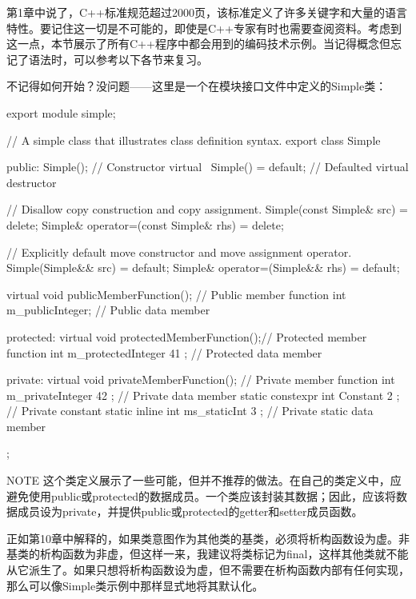 
第1章中说了，C++标准规范超过2000页，该标准定义了许多关键字和大量的语言特性。要记住这一切是不可能的，即使是C++专家有时也需要查阅资料。考虑到这一点，本节展示了所有C++程序中都会用到的编码技术示例。当记得概念但忘记了语法时，可以参考以下各节来复习。


不记得如何开始？没问题——这里是一个在模块接口文件中定义的Simple类：

\begin{cpp}
export module simple;

// A simple class that illustrates class definition syntax.
export class Simple
{
    public:
        Simple(); // Constructor
        virtual ~Simple() = default; // Defaulted virtual destructor

        // Disallow copy construction and copy assignment.
        Simple(const Simple& src) = delete;
        Simple& operator=(const Simple& rhs) = delete;

        // Explicitly default move constructor and move assignment operator.
        Simple(Simple&& src) = default;
        Simple& operator=(Simple&& rhs) = default;

        virtual void publicMemberFunction(); // Public member function
        int m_publicInteger; // Public data member

    protected:
        virtual void protectedMemberFunction();// Protected member function
        int m_protectedInteger { 41 }; // Protected data member

    private:
        virtual void privateMemberFunction(); // Private member function
        int m_privateInteger { 42 }; // Private data member
        static constexpr int Constant { 2 }; // Private constant
        static inline int ms_staticInt { 3 }; // Private static data member
};
\end{cpp}

\begin{myNotic}{NOTE}
这个类定义展示了一些可能，但并不推荐的做法。在自己的类定义中，应避免使用public或protected的数据成员。一个类应该封装其数据；因此，应该将数据成员设为private，并提供public或protected的getter和setter成员函数。
\end{myNotic}

正如第10章中解释的，如果类意图作为其他类的基类，必须将析构函数设为虚。非基类的析构函数为非虚，但这样一来，我建议将类标记为final，这样其他类就不能从它派生了。如果只想将析构函数设为虚，但不需要在析构函数内部有任何实现，那么可以像Simple类示例中那样显式地将其默认化。

